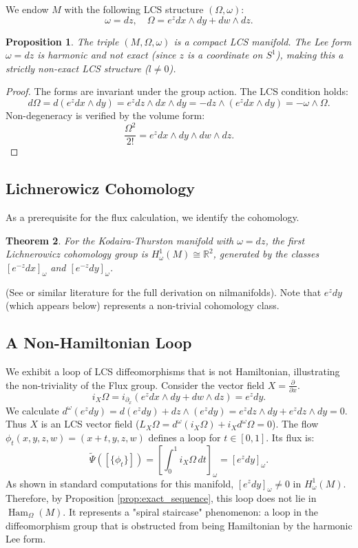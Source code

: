 \documentclass[11pt,a4paper]{amsart}
\newtheorem{theorem}{Theorem}[section]
\newtheorem{proposition}[theorem]{Proposition}
\theoremstyle{definition}
\theoremstyle{remark}
\newcommand{\Ham}{\operatorname{Ham}}
\begin{document}
	We endow $M$ with the following LCS structure $(\Omega, \omega)$:
	\[
	\omega = dz, \quad \Omega = e^z dx \wedge dy + dw \wedge dz.
	\]
	
	\begin{proposition}
		The triple $(M, \Omega, \omega)$ is a compact LCS manifold. The Lee form $\omega = dz$ is harmonic and not exact (since $z$ is a coordinate on $S^1$), making this a strictly non-exact LCS structure ($l \neq 0$).
	\end{proposition}
	
	\begin{proof}
		The forms are invariant under the group action. The LCS condition holds:
		\[
		d\Omega = d(e^z dx \wedge dy) = e^z dz \wedge dx \wedge dy = -dz \wedge (e^z dx \wedge dy) = -\omega \wedge \Omega.
		\]
		Non-degeneracy is verified by the volume form:
		\[
		\frac{\Omega^2}{2!} = e^z dx \wedge dy \wedge dw \wedge dz.
		\]
	\end{proof}
	
	\subsection{Lichnerowicz Cohomology}
	
	As a prerequisite for the flux calculation, we identify the cohomology.
	
	\begin{theorem}
		For the Kodaira-Thurston manifold with $\omega = dz$, the first Lichnerowicz cohomology group is $H_\omega^1(M) \cong \mathbb{R}^2$, generated by the classes $[e^{-z}dx]_\omega$ and $[e^{-z}dy]_\omega$.
	\end{theorem}
	
	(See \cite{Banyaga2001} or similar literature for the full derivation on nilmanifolds). Note that $e^z dy$ (which appears below) represents a non-trivial cohomology class.
	
	\subsection{A Non-Hamiltonian Loop}
	
	We exhibit a loop of LCS diffeomorphisms that is not Hamiltonian, illustrating the non-triviality of the Flux group. Consider the vector field $X = \frac{\partial}{\partial x}$.
	\[
	i_X \Omega = i_{\partial_x}(e^z dx \wedge dy + dw \wedge dz) = e^z dy.
	\]
	We calculate $d^\omega(e^z dy) = d(e^z dy) + dz \wedge (e^z dy) = e^z dz \wedge dy + e^z dz \wedge dy = 0$. Thus $X$ is an LCS vector field ($L_X \Omega = d^\omega(i_X \Omega) + i_X d^\omega \Omega = 0$).	The flow $\phi_t(x, y, z, w) = (x+t, y, z, w)$ defines a loop for $t \in [0,1]$. Its flux is:
	\[
	\widetilde{\Psi}([\{\phi_t\}]) = \left[ \int_0^1 i_X \Omega \, dt \right]_\omega = [e^z dy]_\omega.
	\]
	As shown in standard computations for this manifold, $[e^z dy]_\omega \neq 0$ in $H_\omega^1(M)$. Therefore, by Proposition \ref{prop:exact_sequence}, this loop does not lie in $\Ham_\Omega(M)$. It represents a "spiral staircase" phenomenon: a loop in the diffeomorphism group that is obstructed from being Hamiltonian by the harmonic Lee form.
	
\end{document}
